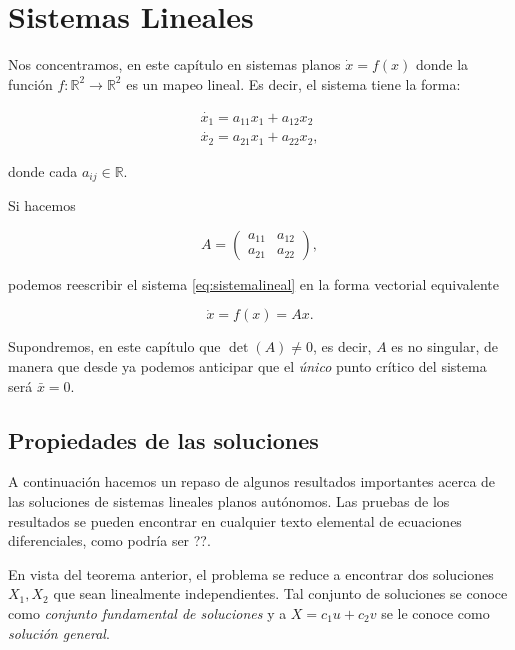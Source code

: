 \documentclass[11pt]{book}
\theoremstyle{definition}
\numberwithin{definition}{section}
\theoremstyle{theorem}
\numberwithin{theorem}{section}
\numberwithin{lemma}{section}
\numberwithin{corollary}{section}
\theoremstyle{plain}
\numberwithin{example}{section}
\newcommand{\R}{{\ensuremath{\mathbb{R}}}}
\begin{document}
\chapter{Sistemas Lineales}

Nos concentramos, en este capítulo en sistemas planos $\dot{x} = f(x)$ donde la función $f: \R^2 \to \R^2$ es un mapeo lineal. Es decir, el sistema tiene la forma:

\begin{equation} \label{eq:sistemalineal}
	\begin{array}{l}
		\dot{x_1} = a_{11}x_1 + a_{12}x_2 \\
		\dot{x_2} = a_{21}x_1 + a_{22}x_2,
	\end{array}
\end{equation}

donde cada $a_{ij} \in \R$.

Si hacemos

$$ A = \left(
\begin{array}{ll}
	a_{11} & a_{12} \\
	a_{21} & a_{22}
\end{array}
\right),
$$

podemos reescribir el sistema \ref{eq:sistemalineal} en la forma vectorial equivalente

\begin{equation} \label{eq:sistemalinealv}
	\dot{x} = f(x) = Ax.
\end{equation}

Supondremos, en este capítulo que $\det(A) \neq 0$, es decir, $A$ es no singular, de manera que desde ya podemos anticipar que el \emph{único} punto crítico del sistema será $\bar{x} = 0$.

\section{Propiedades de las soluciones}

A continuación hacemos un repaso de algunos resultados importantes acerca de las soluciones de sistemas lineales planos autónomos. Las pruebas de los resultados se pueden encontrar en cualquier texto elemental de ecuaciones diferenciales, como podría ser ??.


En vista del teorema anterior, el problema se reduce a encontrar dos soluciones $X_1, X_2$ que sean linealmente independientes. Tal conjunto de soluciones se conoce como \emph{conjunto fundamental de soluciones} y a $X = c_1u + c_2v$ se le conoce como \textit{solución general}.
\end{document}

